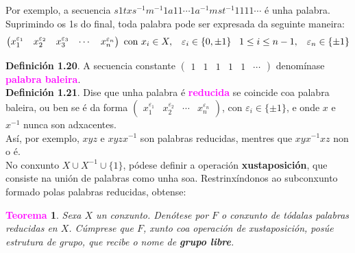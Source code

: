 \documentclass[twoside]{report}
\newcommand{\magbf}[1]{\textcolor{magenta}{\textbf{#1}}} %
\theoremstyle{mystyle}
\newtheorem{theo}{\magbf{Teorema}}[chapter]
\newenvironment{theorem}
{\begin{mdframed}[linecolor = magenta,backgroundcolor = classicrose, linewidth = 2mm]\begin{theo}}
{\end{theo}\end{mdframed}}
\begin{document}
\vspace{2mm}

\noindent Por exemplo, a secuencia $s1txs^{-1}m^{-1}1a11 \cdots 1a^{-1}mst^{-1}1111 \cdots$ é unha palabra.\\

\noindent Suprimindo os 1s do final, toda palabra pode ser expresada da seguinte maneira:
$$\begin{pmatrix}
x_{1}^{\varepsilon_{1}} & x_{2}^{\varepsilon_{2}} & x_{3}^{\varepsilon_{3}} & \cdots & x_{n}^{\varepsilon_{n}}
\end{pmatrix}
\text{    con } x_{i} \in X ,\hspace{3mm} \varepsilon_{i} \in \{0, \pm1\} \hspace{3mm} 1 \leq i \leq n-1 ,\hspace{3mm} \varepsilon_{n} \in \{\pm1\}
$$

\noindent \textbf{Definición 1.20}. A secuencia constante $\begin{pmatrix} 1 & 1 & 1 & 1 & 1 & \cdots \end{pmatrix}$ denomínase \magbf{palabra baleira}.\\

\noindent \textbf{Definición 1.21}. Dise que unha palabra é \magbf{reducida} se coincide coa palabra baleira, ou ben se é da forma $\begin{pmatrix} x_{1}^{\varepsilon_{1}} & x_{2}^{\varepsilon_{2}} & \cdots & x_{n}^{\varepsilon_{n}}\end{pmatrix}$, con $\varepsilon_{i} \in \{\pm1\}$, e onde $x$ e $x^{-1}$ nunca son adxacentes. \\

\noindent Así, por exemplo, $xyz$ e $xyzx^{-1}$ son palabras reducidas, mentres que $xyx^{-1}xz$ non o é.\\

\noindent No conxunto $X \cup X^{-1} \cup \{1\}$, pódese definir a operación \textbf{xustaposición}, que consiste na unión de palabras como unha soa. Restrinxíndonos ao subconxunto formado polas palabras reducidas, obtense: \\

\begin{theorem} \label{th1.10}
Sexa $X$ un conxunto. Denótese por $F$ o conxunto de tódalas palabras reducidas en $X$. Cúmprese que $F$, xunto coa operación de xustaposición, posúe estrutura de grupo, que recibe o nome de \textbf{grupo libre}.
\end{theorem}

\vspace{2mm}
\end{document}
